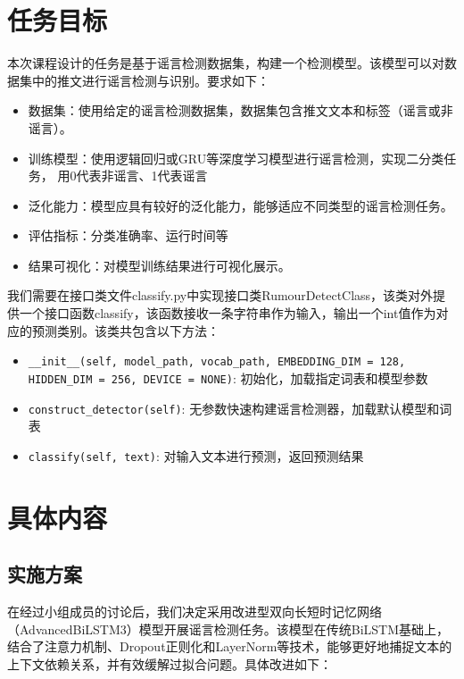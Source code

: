 \chapter{任务目标}

本次课程设计的任务是基于谣言检测数据集，构建一个检测模型。该模型可以对数据集中的推文进行谣言检测与识别。要求如下：
\begin{itemize}
    \item 数据集：使用给定的谣言检测数据集，数据集包含推文文本和标签（谣言或非谣言）。
    \item 训练模型：使用逻辑回归或GRU等深度学习模型进行谣言检测，实现二分类任务，
    用0代表非谣言、1代表谣言
    \item 泛化能力：模型应具有较好的泛化能力，能够适应不同类型的谣言检测任务。
    \item 评估指标：分类准确率、运行时间等
    \item 结果可视化：对模型训练结果进行可视化展示。
\end{itemize}

\vspace{1em}

我们需要在接口类文件classify.py中实现接口类RumourDetectClass，该类对外提供一个接口函数classify，该函数接收一条字符串作为输入，输出一个int值作为对应的预测类别。该类共包含以下方法：
\begin{itemize}
    \item \verb|__init__(self, model_path, vocab_path, EMBEDDING_DIM = 128, |\\
    \verb|HIDDEN_DIM = 256, DEVICE = NONE)|: 初始化，加载指定词表和模型参数
    \item \verb|construct_detector(self)|: 无参数快速构建谣言检测器，加载默认模型和词表
    \item \verb|classify(self, text)|: 对输入文本进行预测，返回预测结果
\end{itemize}

\chapter{具体内容}

\section{实施方案}

在经过小组成员的讨论后，我们决定采用改进型双向长短时记忆网络（AdvancedBiLSTM3）模型开展谣言检测任务。该模型在传统BiLSTM基础上，结合了注意力机制、Dropout正则化和LayerNorm等技术，能够更好地捕捉文本的上下文依赖关系，并有效缓解过拟合问题。具体改进如下：

